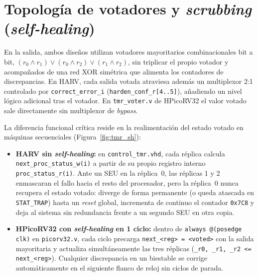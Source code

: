 \documentclass[a4paper,10pt]{article}
\begin{document}
\section{Topología de votadores y \textit{scrubbing} (\textit{self-healing})}

En la salida, ambos diseños utilizan votadores mayoritarios combinacionales bit a bit, $(r_0 \land r_1) \lor (r_0 \land r_2) \lor (r_1 \land r_2)$, sin triplicar el propio votador y acompañados de una red XOR simétrica que alimenta los contadores de discrepancias. En HARV, cada salida votada atraviesa además un multiplexor 2:1 controlado por \texttt{correct\_error\_i} (\texttt{harden\_conf\_r[4..5]}), añadiendo un nivel lógico adicional tras el votador. En \texttt{tmr\_voter.v} de HPicoRV32 el valor votado sale directamente sin multiplexor de \textit{bypass}.

La diferencia funcional crítica reside en la realimentación del estado votado en máquinas secuenciales (Figura~\ref{fig:tmr_sh}):
\begin{itemize}
  \item \textbf{HARV sin \textit{self-healing}:} en \texttt{control\_tmr.vhd}, cada réplica calcula \texttt{next\_proc\_status\_w(i)} a partir de su propio registro interno \texttt{proc\_status\_r(i)}. Ante un SEU en la réplica~0, las réplicas 1 y 2 enmascaran el fallo hacia el resto del procesador, pero la réplica~0 nunca recupera el estado votado: diverge de forma permanente (o queda atascada en \texttt{STAT\_TRAP}) hasta un \textit{reset} global, incrementa de continuo el contador \texttt{0x7C8} y deja al sistema sin redundancia frente a un segundo SEU en otra copia.
  \item \textbf{HPicoRV32 con \textit{self-healing} en 1 ciclo:} dentro de \texttt{always @(posedge clk)} en \texttt{picorv32.v}, cada ciclo precarga \texttt{next\_<reg> = <voted>} con la salida mayoritaria y actualiza simultáneamente las tres réplicas (\texttt{\_r0, \_r1, \_r2 <= next\_<reg>}). Cualquier discrepancia en un biestable se corrige automáticamente en el siguiente flanco de reloj sin ciclos de parada.
\end{itemize}
\end{document}
